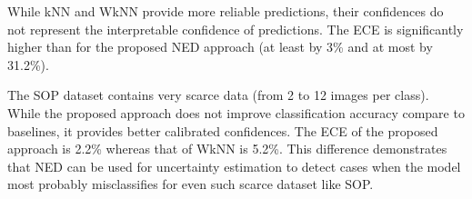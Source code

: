 \documentclass{article}
\begin{document}
\begin{table*}[h]
	\begin{center}
		\caption{The accuracy and ECE of proposed NED algorithm and the four baselines (1NN, kNN, WkNN~\cite{b70}, and WkNN~\cite{b69}). The best results of each column are shown in \textbf{boldface}. The proposed approach consistently outperforms the baseline methods for all experiments. }
		\label{tab:clean_retreival_preformance}
	\end{center}
\end{table*}

While kNN and WkNN provide more reliable predictions, their confidences do not represent the interpretable confidence of predictions. The ECE is significantly higher than for the proposed NED approach (at least by 3\% and at most by 31.2\%).

The SOP dataset contains very scarce data (from 2 to 12 images per class). While the proposed approach does not improve classification accuracy compare to baselines, it provides better calibrated confidences. The ECE of the proposed approach is 2.2\% whereas that of WkNN is 5.2\%.  This difference demonstrates that NED can be used for uncertainty estimation to detect cases when the model most probably misclassifies for even such scarce dataset like SOP.
\end{document}
